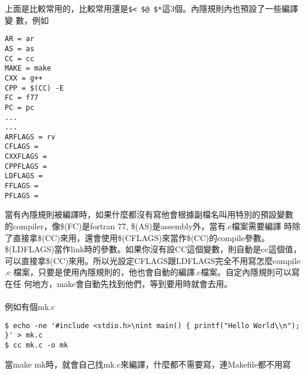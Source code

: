   上面是比較常用的，比較常用還是\verb=$< $@ $*=這3個。內隱規則內也預設了一些編譯變
  數，例如
  \begin{verbatim}
AR = ar
AS = as
CC = cc
MAKE = make
CXX = g++
CPP = $(CC) -E
FC = f77
PC = pc
...
...
ARFLAGS = rv
CFLAGS =
CXXFLAGS =
CPPFLAGS =
LDFLAGS =
FFLAGS =
PFLAGS =
  \end{verbatim}
  當有內隱規則被編譯時，如果什麼都沒有寫他會根據副檔名叫用特別的預設變數
  的compiler，像\$(FC)是fortran 77, \$(AS)是assembly外，當有.c檔案需要編譯
  時除了直接拿\$(CC)來用，還會使用\$(CFLAGS)來當作\$(CC)的compile參數。
  \$(LDFLAGS)當作link時的參數。如果你沒有設CC這個變數，則自動是cc這個值，
  可以直接拿\$(CC)來用。所以光設定CFLAGS跟LDFLAGS完全不用寫怎麼compile .c
  檔案，只要是使用內隱規則的，他也會自動的編譯.c檔案。自定內隱規則可以寫在任
  何地方，make會自動先找到他們，等到要用時就會去用。
  \\\\
  例如有個mk.c
  \begin{verbatim}
$ echo -ne '#include <stdio.h>\nint main() { printf("Hello World\\n"); }' > mk.c
$ cc mk.c -o mk
\end{verbatim}
當make mk時，就會自己找mk.c來編譯，什麼都不需要寫，連Makefile都不用寫

